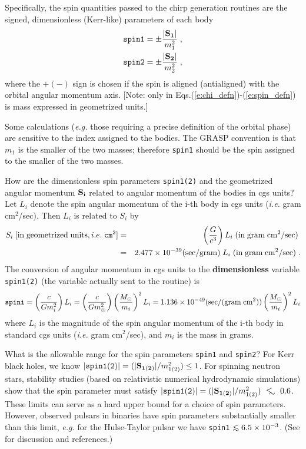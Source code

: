 Specifically, the spin quantities passed to the chirp generation routines 
are the signed, dimensionless (Kerr-like) parameters of each body
\begin{eqnarray}
{\tt spin1} = \pm { |{\bf S_1} | \over m_1^2 } \; ,  \\
\label{e:spin_defn}
{\tt spin2} = \pm { |{\bf S_2} | \over m_2^2 } \; ,
\end{eqnarray}
where the $+(-)$ sign is chosen if the spin is aligned (antialigned)
with the orbital angular momentum axis.
[Note: only in Eqs.(\ref{e:chi_defn})-(\ref{e:spin_defn})
is mass expressed in geometrized units.]

Some calculations
({\it e.g.} those requiring a precise definition of the
orbital phase) are sensitive to the index assigned to
the bodies.
The GRASP convention is that $m_1$ is the smaller of
the two masses;
therefore {\tt spin1} should be the spin assigned to 
the smaller of the two masses.

How are the dimensionless spin parameters {\tt spin1(2)}
and the geometrized angular momentum $\bf S_i$
related to angular momentum of the bodies in cgs units?
Let $L_i$ denote the spin angular momentum 
of the i-th body in cgs units
({\it i.e.} gram cm$^2$/sec).
Then $L_i$ is related to $S_i$ by
\begin{eqnarray}
S_i \; [{\rm in\;geometrized\;units}, i.e. \; {\tt cm^2} ] &=& \;
\left({G \over c^3 }\right)  
L_i\;({\rm in \; gram\;cm^2/sec})  \;  \nonumber \\
&=& 2.477 \times 10^{-39}({\rm sec /gram}) 
\; L_i\;({\rm in \; gram\;cm^2/sec})  \; .
\end{eqnarray}
The conversion of angular momentum in cgs units
to the {\bf dimensionless} variable {\tt spin1(2)} 
(the variable actually sent to the routine)
is
\begin{equation}
\label{e:cgstogeom}
{\tt spini} = \left( {c \over G m_{i}^2 } \right)  L_i
= \left( {c \over G m_\odot^2 } \right) 
\left(  {M_\odot \over m_i} \right)^2 L_i
= 1.136 \times 10^{-49}  ({\rm sec / (gram \; cm^2) })
\left(  {M_\odot \over m_i} \right)^2 L_i
\end{equation}
where $L_i$ is the magnitude of the spin angular momentum of the i-th body 
in standard cgs units ({\it i.e.} gram cm$^2$/sec),  
and $m_i$ is the mass in grams.

What is the allowable range for the spin parameters {\tt spin1} and {\tt spin2}?
For Kerr black holes, we know $|{\tt spin1(2)}| = (|{\bf S_{1(2)}} | / m_{1(2)}^2 ) \leq 1$.
For spinning neutron stars, stability studies
(based on relativistic numerical hydrodynamic simulations)
show that the spin parameter must satisfy
$|{\tt spin1}({\tt 2})| = (|{\bf S_{1(2)}} | / m_{1(2)}^2 )
\mathrel{\raise.3ex\hbox{ $<$ } \mkern-14mu \lower0.6ex\hbox{$\sim$ } } 0.6$.
These limits can serve as a hard upper bound for a choice
of spin parameters.
However, observed pulsars in binaries have spin parameters substantially
smaller than this limit, {\it e.g.} for the Hulse-Taylor pulsar we
have {\tt spin1}
$\mathrel{\raise.3ex\hbox{$<$}\mkern-14mu \lower0.6ex\hbox{$\sim$}} 
6.5\times 10^{-3}$.
(See \cite{bdiww} for discussion and references.)

